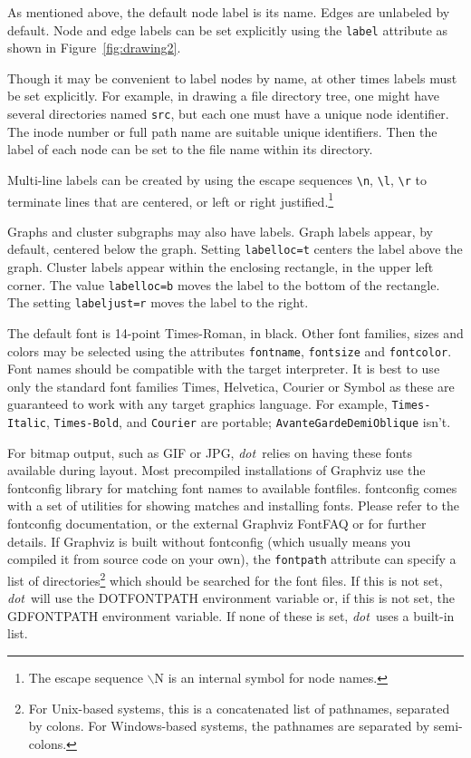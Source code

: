 \documentclass[11pt]{article}
\def\dot{{\it dot}}
\begin{document}
As mentioned above, the default node label is its name.
Edges are unlabeled by default.
Node and edge labels can be set explicitly using the {\tt label}
attribute as shown in 
Figure~\ref{fig:drawing2}.

Though it may be convenient to label nodes by name, at other times
labels must be set explicitly.  For example, in drawing a file
directory tree, one might have several directories named {\tt src},
but each one must have a unique node identifier.
The inode number or full path name are suitable unique identifiers.
Then the label of each node can be set to the file name within
its directory. 

Multi-line labels can be created by using the escape 
sequences \verb"\n", \verb"\l", \verb"\r" to terminate
lines that are centered, or left or right justified.\footnote{The escape
sequence $\backslash$N is an internal symbol for node names.}


Graphs and cluster subgraphs may also have labels. Graph labels
appear, by default, centered below the graph. Setting {\tt labelloc=t}
centers the label above the graph. Cluster labels appear within the
enclosing rectangle, in the upper left corner. The value {\tt labelloc=b}
moves the label to the bottom of the rectangle. The setting
{\tt labeljust=r} moves the label to the right.

The default font is 14-point Times-Roman, in black.
Other font families, sizes and colors may be selected using the
attributes {\tt fontname}, {\tt fontsize} and {\tt fontcolor}.
Font names should be compatible with the target interpreter.
It is best to use only the standard font families
Times, Helvetica, Courier or Symbol as these are guaranteed to work
with any target graphics language.
For example, \verb"Times-Italic", \verb"Times-Bold", and \verb"Courier"
are portable; {\tt AvanteGarde\-DemiOblique} isn't.

For bitmap output, such as GIF or JPG, \dot\ relies on having these
fonts available during layout. Most precompiled installations of
Graphviz use the fontconfig library for matching font names to
available fontfiles. fontconfig comes with a set of utilities for
showing matches and installing fonts. Please refer to the fontconfig
documentation, or the external Graphviz FontFAQ or for further details.
If Graphviz is built without fontconfig (which usually means you
compiled it from source code on your own), the {\tt fontpath} attribute
can specify a list of directories\footnote{For Unix-based systems, this is
a concatenated list of pathnames, separated by colons. For Windows-based
systems, the pathnames are separated by semi-colons.} which should be 
searched for the font files. If this is not set, 
\dot\ will use the DOTFONTPATH environment variable or, if this is not
set, the GDFONTPATH environment variable. If none of these is set, \dot\
uses a built-in list.
\end{document}
